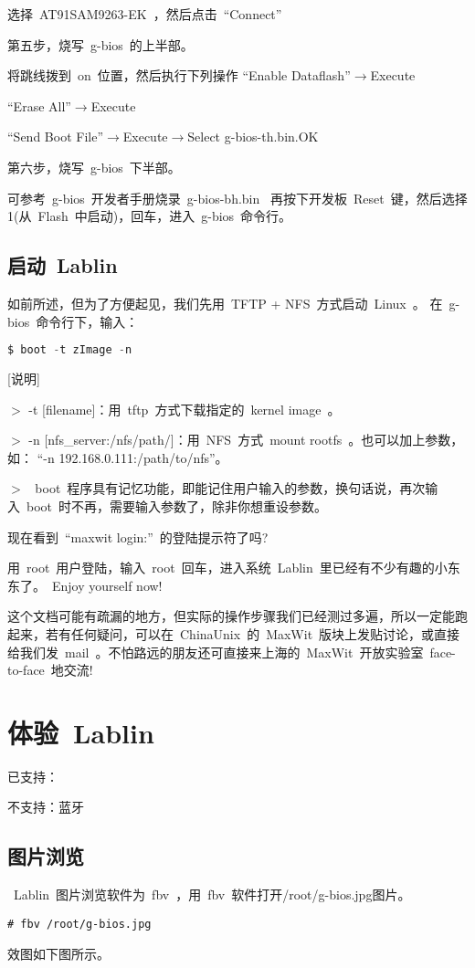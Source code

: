 \documentclass[a4paper,11pt]{article}
\begin{document}
\begin{CJK*}{UTF8}{gbsn}
选择~AT91SAM9263-EK~，然后点击~``Connect''~

第五步，烧写~g-bios~的上半部。

将跳线拨到~on~位置，然后执行下列操作
``Enable Dataflash''$\rightarrow$Execute

``Erase All''$\rightarrow$Execute

``Send Boot File''$\rightarrow$Execute$\rightarrow$Select g-bios-th.bin.OK

第六步，烧写~g-bios~下半部。

可参考~g-bios~开发者手册烧录~g-bios-bh.bin~
再按下开发板~Reset~键，然后选择1(从~Flash~中启动)，回车，进入~g-bios~命令行。

\subsection{启动~Lablin~}
如前所述，但为了方便起见，我们先用~TFTP + NFS~方式启动~Linux~。
在~g-bios~命令行下，输入：

\begin{lstlisting}[language=c,numbers=none]
$ boot -t zImage -n
\end{lstlisting}

[说明]

$>$ -t [filename]：用~tftp~方式下载指定的~kernel image~。

$>$ -n [nfs\_server:/nfs/path/]：用~NFS~方式~mount rootfs~。也可以加上参数，如：
``-n 192.168.0.111:/path/to/nfs''。

$>$ ~boot~程序具有记忆功能，即能记住用户输入的参数，换句话说，再次输入~boot~时不再，需要输入参数了，除非你想重设参数。

现在看到~``maxwit login:''~的登陆提示符了吗?

用~root~用户登陆，输入~root~回车，进入系统~Lablin~里已经有不少有趣的小东东了。~Enjoy yourself now!~

这个文档可能有疏漏的地方，但实际的操作步骤我们已经测过多遍，所以一定能跑起来，若有任何疑问，可以在~ChinaUnix~的~MaxWit~版块上发贴讨论，或直接给我们发~mail~。不怕路远的朋友还可直接来上海的~MaxWit~开放实验室~face-to-face~地交流!
\section{体验~Lablin~}
已支持：

不支持：蓝牙

\subsection{图片浏览}
~Lablin~图片浏览软件为~fbv~，用~fbv~软件打开/root/g-bios.jpg图片。
\begin{lstlisting}[numbers=none]
# fbv /root/g-bios.jpg
\end{lstlisting}
效图如下图所示。


\end{CJK*}
\end{document}
